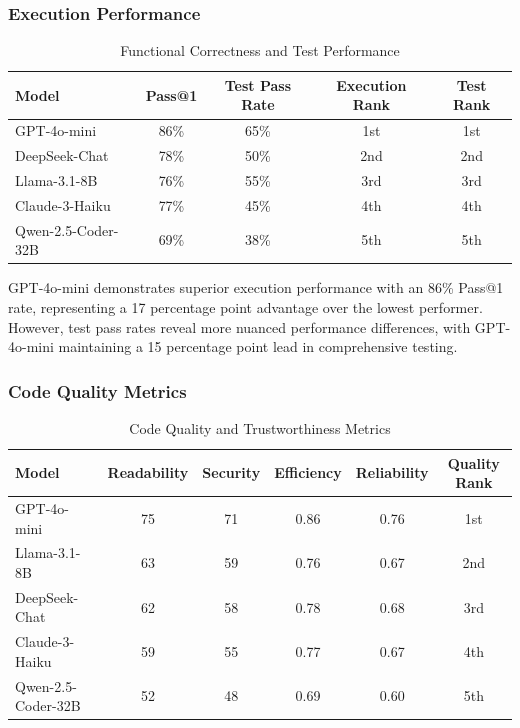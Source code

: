 \documentclass[conference]{IEEEtran}
\begin{document}
\subsubsection{Execution Performance}

\begin{table}[ht]
\centering
\small
\caption{Functional Correctness and Test Performance}
\begin{tabular}{lcccc}
\toprule
\textbf{Model} & \textbf{Pass@1} & \textbf{Test Pass Rate} & \textbf{Execution Rank} & \textbf{Test Rank} \\
\midrule
GPT-4o-mini & 86\% & 65\% & 1st & 1st \\
DeepSeek-Chat & 78\% & 50\% & 2nd & 2nd \\
Llama-3.1-8B & 76\% & 55\% & 3rd & 3rd \\
Claude-3-Haiku & 77\% & 45\% & 4th & 4th \\
Qwen-2.5-Coder-32B & 69\% & 38\% & 5th & 5th \\
\bottomrule
\end{tabular}
\label{tab:functional_correctness}
\end{table}

GPT-4o-mini demonstrates superior execution performance with an 86\% Pass@1 rate, representing a 17 percentage point advantage over the lowest performer. However, test pass rates reveal more nuanced performance differences, with GPT-4o-mini maintaining a 15 percentage point lead in comprehensive testing.

\subsubsection{Code Quality Metrics}

\begin{table}[ht]
\centering
\small
\caption{Code Quality and Trustworthiness Metrics}
\begin{tabular}{lccccc}
\toprule
\textbf{Model} & \textbf{Readability} & \textbf{Security} & \textbf{Efficiency} & \textbf{Reliability} & \textbf{Quality Rank} \\
\midrule
GPT-4o-mini & 75 & 71 & 0.86 & 0.76 & 1st \\
Llama-3.1-8B & 63 & 59 & 0.76 & 0.67 & 2nd \\
DeepSeek-Chat & 62 & 58 & 0.78 & 0.68 & 3rd \\
Claude-3-Haiku & 59 & 55 & 0.77 & 0.67 & 4th \\
Qwen-2.5-Coder-32B & 52 & 48 & 0.69 & 0.60 & 5th \\
\bottomrule
\end{tabular}
\label{tab:code_quality}
\end{table}
\end{document}
